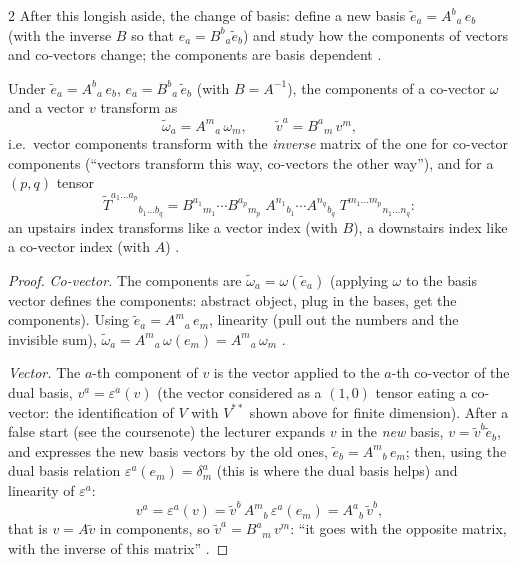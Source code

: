 \begin{paracol}{2}
After this longish aside, the change of basis: define a new basis $\tilde e_a=A^b{}_a\,e_b$ (with the inverse $B$ so that $e_a=B^b{}_a\tilde e_b$) and study how the components of vectors and co-vectors change; the components are basis dependent
.
\begin{proposition}\label{prop:te-transform}
Under $\tilde e_a=A^b{}_a\,e_b$, $e_a=B^b{}_a\,\tilde e_b$ (with $B=A^{-1}$), the components of a co-vector $\omega$ and a vector $v$ transform as
\[
  \tilde\omega_a=A^m{}_a\,\omega_m,\qquad \tilde v^a=B^a{}_m\,v^m,
\]
i.e.\ vector components transform with the \emph{inverse} matrix of the one for co-vector components (``vectors transform this way, co-vectors the other way''), and for a $(p,q)$ tensor
\[
  \tilde T^{a_1\dots a_p}{}_{b_1\dots b_q}=B^{a_1}{}_{m_1}\cdots B^{a_p}{}_{m_p}\;A^{n_1}{}_{b_1}\cdots A^{n_q}{}_{b_q}\;T^{m_1\dots m_p}{}_{n_1\dots n_q}:
\]
an upstairs index transforms like a vector index (with $B$), a downstairs index like a co-vector index (with $A$)
.
\end{proposition}
\begin{proof}
\emph{Co-vector.} The components are $\tilde\omega_a=\omega(\tilde e_a)$ (applying $\omega$ to the basis vector defines the components: abstract object, plug in the bases, get the components). Using $\tilde e_a=A^m{}_a\,e_m$, linearity (pull out the numbers and the invisible sum), $\tilde\omega_a=A^m{}_a\,\omega(e_m)=A^m{}_a\,\omega_m$
.

\emph{Vector.} The $a$-th component of $v$ is the vector applied to the $a$-th co-vector of the dual basis, $v^a=\varepsilon^a(v)$ (the vector considered as a $(1,0)$ tensor eating a co-vector: the identification of $V$ with $V^{**}$ shown above for finite dimension). After a false start (see the coursenote) the lecturer expands $v$ in the
\emph{new} basis, $v=\tilde v^b\tilde e_b$, and expresses the new basis vectors by the old ones, $\tilde e_b=A^m{}_b\,e_m$; then, using the dual basis relation $\varepsilon^a(e_m)=\delta^a_m$ (this is where the dual basis helps) and linearity of $\varepsilon^a$:
\[
  v^a=\varepsilon^a(v)=\tilde v^b\,A^m{}_b\,\varepsilon^a(e_m)=A^a{}_b\,\tilde v^b,
\]
that is $v=A\tilde v$ in components, so $\tilde v^a=B^a{}_m\,v^m$: ``it goes with the opposite matrix, with the inverse of this matrix'' .


\end{proof}
\end{paracol}

